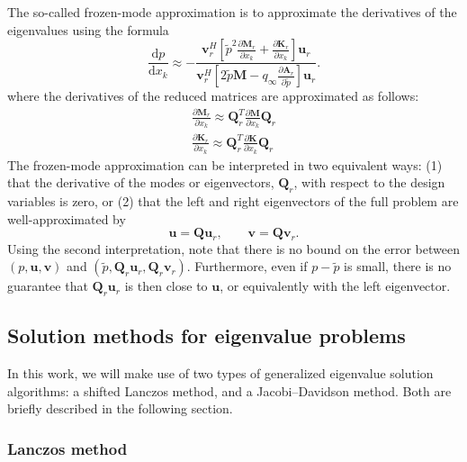 \documentclass[12pt]{article}
\newcommand{\p}{\partial}
\newcommand{\f}{\frac}
\newcommand{\mb}{\mathbf}
\newcommand{\ds}{\displaystyle}
\begin{document}
The so-called frozen-mode approximation is to approximate the
derivatives of the eigenvalues using the formula
\begin{equation*}
  \f{\mathrm{d} p}{\mathrm{d} x_{k}} \approx
  - \f{\ds{\mb{v}_{r}^{H} \left[ \tilde{p}^2 \f{\p \mb{M}_{r}}{\p x_{k}} + 
        \f{\p \mb{K}_{r}}{\p x_{k}} \right] \mb{u}_{r}}}{
    \ds{ \mb{v}_{r}^{H} \left[ 2\tilde{p} \mb{M} - q_{\infty} \f{\p \mb{A}_{r}}{\p \tilde{p}} \right] \mb{u}_{r}}}.
\end{equation*}
where the derivatives of the reduced matrices are approximated as follows:
\begin{equation*}
  \begin{aligned}
    \f{\p \mb{M}_{r}}{\p x_{k}} \approx \mb{Q}_{r}^{T} \f{\p \mb{M}}{\p x_{k}} \mb{Q}_{r} \\
    \f{\p \mb{K}_{r}}{\p x_{k}} \approx \mb{Q}_{r}^{T} \f{\p \mb{K}}{\p x_{k}} \mb{Q}_{r}
   \end{aligned}
\end{equation*}
%
The frozen-mode approximation can be interpreted in two equivalent
ways: (1) that the derivative of the modes or eigenvectors,
$\mb{Q}_{r}$, with respect to the design variables is zero, or (2)
that the left and right eigenvectors of the full problem are
well-approximated by
%
\begin{equation*}
  \mb{u} = \mb{Q} \mb{u}_{r}, \qquad
  \mb{v} = \mb{Q} \mb{v}_{r}.
\end{equation*}
Using the second interpretation, note that there is no bound on the
error between $(p, \mb{u}, \mb{v})$ and $(\tilde{p}, \mb{Q}_{r}
\mb{u}_{r}, \mb{Q}_{r} \mb{v}_{r})$. Furthermore, even if $p -
\tilde{p}$ is small, there is no guarantee that $\mb{Q}_{r}
\mb{u}_{r}$ is then close to $\mb{u}$, or equivalently with the left
eigenvector.

\subsection{Solution methods for eigenvalue problems}

In this work, we will make use of two types of generalized eigenvalue
solution algorithms: a shifted Lanczos method, and a Jacobi--Davidson
method. Both are briefly described in the following section.

\subsubsection{Lanczos method}
\end{document}
